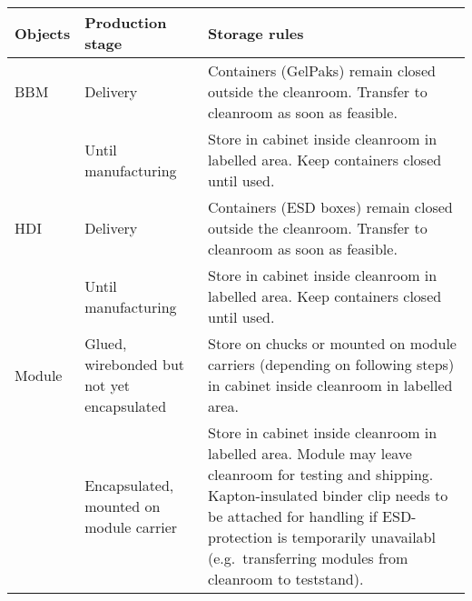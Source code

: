 \documentclass[12pt]{unlsilabsop}
\begin{document}
\begin{tabular}{p{2.5cm}p{4.5cm}p{8cm}}
    \toprule
Objects & Production stage & Storage rules \\
    \midrule
BBM & Delivery & Containers (GelPaks) remain closed outside the cleanroom. Transfer to cleanroom as soon as feasible. \\
    & Until manufacturing & Store in cabinet inside cleanroom in labelled area. Keep containers closed until used. \\
    \midrule
HDI & Delivery & Containers (ESD boxes) remain closed outside the cleanroom. Transfer to cleanroom as soon as feasible. \\
    & Until manufacturing & Store in cabinet inside cleanroom in labelled area. Keep containers closed until used. \\
    \midrule
Module & Glued, wirebonded but not yet encapsulated & Store on chucks or mounted on module carriers (depending on following steps) in cabinet inside cleanroom in labelled area. \\
       & Encapsulated, mounted on module carrier & Store in cabinet inside cleanroom in labelled area. Module may leave cleanroom for testing and shipping. Kapton-insulated binder clip needs to be attached for handling if ESD-protection is temporarily unavailabl (e.g.~transferring modules from cleanroom to teststand). \\
    \bottomrule
\end{tabular}
\end{document}
